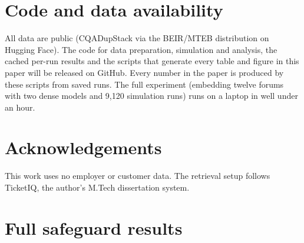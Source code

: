 \documentclass[11pt]{article}
\begin{document}
\section*{Code and data availability}
All data are public (CQADupStack via the BEIR/MTEB distribution on Hugging Face). The code for data preparation, simulation and analysis, the cached per-run results and the scripts that generate every table and figure in this paper will be released on GitHub. Every number in the paper is produced by these scripts from saved runs. The full experiment (embedding twelve forums with two dense models and 9{,}120 simulation runs) runs on a laptop in well under an hour.

\section*{Acknowledgements}
This work uses no employer or customer data. The retrieval setup follows TicketIQ, the author's M.Tech dissertation system.



\appendix
\section{Full safeguard results}\label{app:safe}
\begin{table}[h]\centering\scriptsize

\caption{Paired change in top-1 accuracy (points, 95\% interval over ten orders) relative to no write-back, for the dense retrievers.}
\label{tab:safe}
\end{table}
\end{document}
